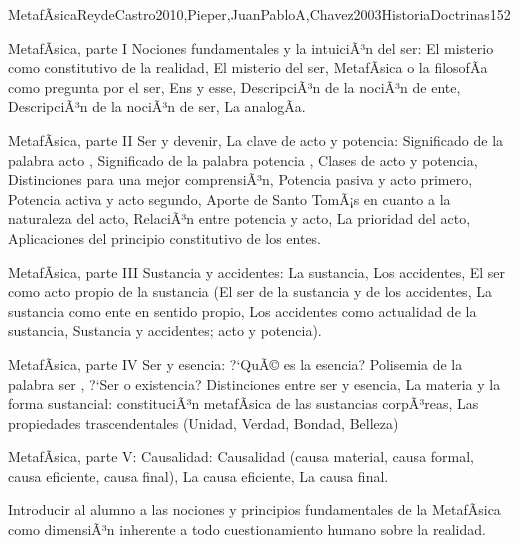\begin{syllabus}
\begin{unit}{MetafÃ­sica}{ReydeCastro2010,Pieper,JuanPabloA,Chavez2003HistoriaDoctrinas}{15}{2}
\begin{topics}
	\item MetafÃ­sica, parte I  Nociones fundamentales y la intuiciÃ³n del ser: El misterio como constitutivo de la realidad, El misterio del ser, MetafÃ­sica o la filosofÃ­a como pregunta por el ser, Ens y esse, DescripciÃ³n de la nociÃ³n de ente, DescripciÃ³n de la nociÃ³n de ser, La analogÃ­a.
	\item MetafÃ­sica, parte II  Ser y devenir, La clave de acto y potencia: Significado de la palabra  acto , Significado de la palabra  potencia , Clases de acto y potencia, Distinciones para una mejor comprensiÃ³n, Potencia pasiva y acto primero, Potencia activa y acto segundo, Aporte de Santo TomÃ¡s en cuanto a la naturaleza del acto, RelaciÃ³n entre potencia y acto, La prioridad del acto, Aplicaciones del principio constitutivo de los entes.
	\item MetafÃ­sica, parte III  Sustancia y accidentes: La sustancia, Los accidentes, El ser como acto propio de la sustancia (El ser de la sustancia y de los accidentes, La sustancia como ente en sentido propio, Los accidentes como actualidad de la sustancia, Sustancia y accidentes; acto y potencia).
	\item MetafÃ­sica, parte IV  Ser y esencia: ?`QuÃ© es la esencia? Polisemia de la palabra  ser , ?`Ser o existencia? Distinciones entre ser y esencia, La materia y la forma sustancial: constituciÃ³n metafÃ­sica de las sustancias corpÃ³reas, Las propiedades trascendentales (Unidad, Verdad, Bondad, Belleza)
	\item MetafÃ­sica, parte V: Causalidad: Causalidad (causa material, causa formal, causa eficiente, causa final), La causa eficiente, La causa final.
\end{topics}

\begin{unitgoals}
	\item Introducir al alumno a las nociones y principios fundamentales de la MetafÃ­sica como dimensiÃ³n inherente a todo cuestionamiento humano sobre la realidad.
\end{unitgoals}
\end{unit}



\begin{coursebibliography}
\end{coursebibliography}

\end{syllabus}
